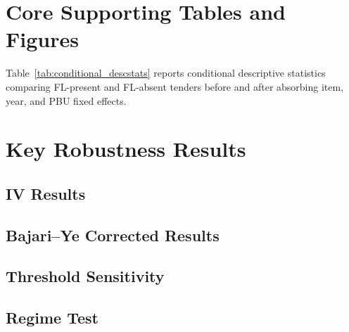 
\section{Core Supporting Tables and Figures}
\label{app:competition}

Table~\ref{tab:conditional_descstats} reports conditional descriptive
statistics comparing FL-present and FL-absent tenders before and after
absorbing item, year, and PBU fixed effects.







\section{Key Robustness Results}
\label{app:robustness}

\subsection{IV Results}



\subsection{Bajari--Ye Corrected Results}



\subsection{Threshold Sensitivity}

\begin{table}[htbp]
\centering
\caption{Price Coefficient Across IQR Multiplier Thresholds}
\label{tab:threshold}

\end{table}

\subsection{Regime Test}



